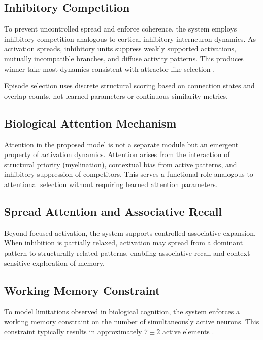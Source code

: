 \documentclass[11pt]{article}
\begin{document}
\subsection{Inhibitory Competition}

To prevent uncontrolled spread and enforce coherence, the system employs
inhibitory competition analogous to cortical inhibitory interneuron dynamics.
As activation spreads, inhibitory units suppress weakly supported activations,
mutually incompatible branches, and diffuse activity patterns.
This produces winner-take-most dynamics consistent with attractor-like selection \citep{rolls2007attractor,treves1994computational}.

Episode selection uses discrete structural scoring based on connection states and overlap counts,
not learned parameters or continuous similarity metrics.

\subsection{Biological Attention Mechanism}

Attention in the proposed model is not a separate module but an emergent property
of activation dynamics.
Attention arises from the interaction of structural priority (myelination),
contextual bias from active patterns, and inhibitory suppression of competitors.
This serves a functional role analogous to attentional selection without requiring learned attention parameters.

\subsection{Spread Attention and Associative Recall}

Beyond focused activation, the system supports controlled associative expansion.
When inhibition is partially relaxed, activation may spread from a dominant
pattern to structurally related patterns, enabling associative recall and
context-sensitive exploration of memory.

\subsection{Working Memory Constraint}

To model limitations observed in biological cognition, the system enforces a
working memory constraint on the number of simultaneously active neurons.
This constraint typically results in approximately $7 \pm 2$ active elements \citep{miller1956magical}.
\end{document}
